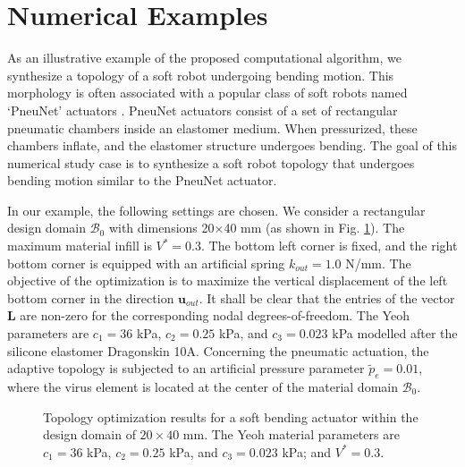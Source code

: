 \section{Numerical Examples}
\label{chap:results}
As an illustrative example of the proposed computational algorithm, we synthesize a topology of a soft robot undergoing bending motion. This morphology is often associated with a popular class of soft robots named `PneuNet' actuators \cite{Polygerinos2015b, Galloway2016, Hughes2016}. PneuNet actuators consist of a set of rectangular pneumatic chambers inside an elastomer medium. When pressurized, these chambers inflate, and the elastomer structure undergoes bending. The goal of this numerical study case is to synthesize a soft robot topology that undergoes bending motion similar to the PneuNet actuator. 

In our example, the following settings are chosen. We consider a rectangular design domain $\mathcal{B}_0$ with dimensions 20$\times$40 mm (as shown in Fig. \ref{fig:topo_result}). The maximum material infill is $V^* = 0.3$. The bottom left corner is fixed, and the right bottom corner is equipped with an artificial spring $k_{out} = 1.0$ N/mm. The objective of the optimization is to maximize the vertical displacement of the left bottom corner in the direction $\boldsymbol{u}_{out}$. It shall be clear that the entries of the vector $\boldsymbol{L}$ are non-zero for the corresponding nodal degrees-of-freedom. The Yeoh parameters are $c_1 = 36$ kPa, $c_2 = 0.25$ kPa, and $c_3 = 0.023$ kPa modelled after the silicone elastomer Dragonskin 10A. Concerning the pneumatic actuation, the adaptive topology is subjected to an artificial pressure parameter $\tilde{p}_e = 0.01$, where the virus element is located at the center of the material domain $\mathcal{B}_0$.

\begin{figure}[!b]
    \centering
    \vspace{-3mm}
    \caption{Topology optimization results for a soft bending actuator within the design domain of $20 \times 40$ mm. The Yeoh material parameters are $c_1 = 36$ kPa, $c_2 = 0.25$ kPa, and $c_3 = 0.023$ kPa; and $V^* = 0.3$.}
    \label{fig:topo_result}
  \end{figure}

